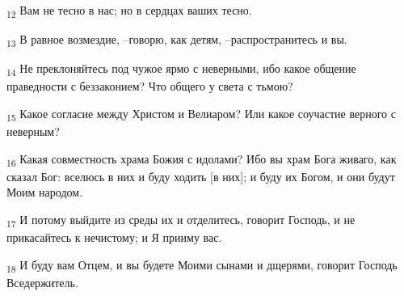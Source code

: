 \begin{tcolorbox}
\textsubscript{12} Вам не тесно в нас; но в сердцах ваших тесно.
\end{tcolorbox}
\begin{tcolorbox}
\textsubscript{13} В равное возмездие, --говорю, как детям, --распространитесь и вы.
\end{tcolorbox}
\begin{tcolorbox}
\textsubscript{14} Не преклоняйтесь под чужое ярмо с неверными, ибо какое общение праведности с беззаконием? Что общего у света с тьмою?
\end{tcolorbox}
\begin{tcolorbox}
\textsubscript{15} Какое согласие между Христом и Велиаром? Или какое соучастие верного с неверным?
\end{tcolorbox}
\begin{tcolorbox}
\textsubscript{16} Какая совместность храма Божия с идолами? Ибо вы храм Бога живаго, как сказал Бог: вселюсь в них и буду ходить [в них]; и буду их Богом, и они будут Моим народом.
\end{tcolorbox}
\begin{tcolorbox}
\textsubscript{17} И потому выйдите из среды их и отделитесь, говорит Господь, и не прикасайтесь к нечистому; и Я прииму вас.
\end{tcolorbox}
\begin{tcolorbox}
\textsubscript{18} И буду вам Отцем, и вы будете Моими сынами и дщерями, говорит Господь Вседержитель.
\end{tcolorbox}

